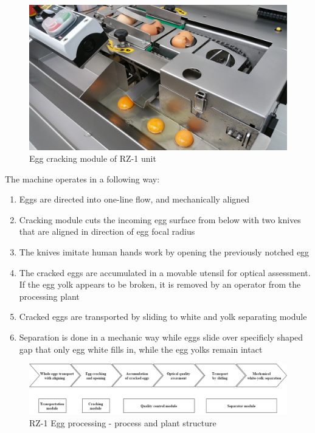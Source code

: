 \documentclass[12pt,twoside,a4paper]{article}
\begin{document}
\begin{figure}[H]
\centering
\includegraphics[width=0.4\paperwidth]{rz1crack}
\caption{Egg cracking  module of RZ-1 unit}
\end{figure}


The machine operates in a following way:
\begin{enumerate}
\item Eggs are directed into one-line flow, and mechanically aligned

\item Cracking module cuts the incoming egg surface from below with two knives that are aligned in direction of egg focal radius
\item The knives imitate human hands work by opening the previously notched egg
\item The cracked eggs are accumulated in a movable utensil for optical assessment. 
If the egg yolk appears to be broken, it is removed by an operator from the processing plant
\item Cracked eggs are transported by sliding to white and yolk separating module
\item Separation  is done in a mechanic way while eggs slide over specificly shaped gap that only egg white fills in, while the egg yolks remain intact
\end{enumerate}

\begin{figure}[H]
\centering
\includegraphics[width=0.8\paperwidth]{process}
\caption{RZ-1 Egg processing  - process and plant structure}

\end{figure}
\end{document}
